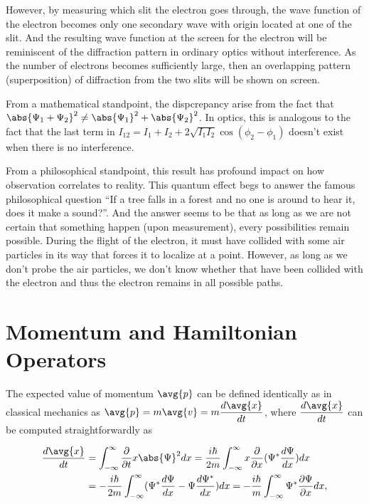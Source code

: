 \documentclass[a4paper,12pt]{report}
\begin{document}
However, by measuring which slit the electron goes through, the wave function of the electron becomes only one secondary wave with origin located at one of the slit. And the resulting wave function at the screen for the electron will be reminiscent of the diffraction pattern in ordinary optics without interference. As the number of electrons becomes sufficiently large, then an overlapping pattern (superposition) of diffraction from the two slits will be shown on screen.

From a mathematical standpoint, the dispcrepancy arise from the fact that \(\abs{\Psi_1 + \Psi_2}^2 \neq \abs{\Psi_1}^2 + \abs{\Psi_2}^2\). In optics, this is analogous to the fact that the last term in \(I_{12} = I_1 + I_2 + 2\sqrt{I_1I_2} \cos(\phi_2 - \phi_1)\) doesn't exist when there is no interference. 

From a philosophical standpoint, this result has profound impact on how observation correlates to reality. This quantum effect begs to answer the famous philosophical question ``If a tree falls in a forest and no one is around to hear it, does it make a sound?''. And the answer seems to be that as long as we are not certain that something happen (upon measurement), every possibilities remain possible. During the flight of the electron, it must have collided with some air particles in its way that forces it to localize at a point. However, as long as we don't probe the air particles, we don't know whether that have been collided with the electron and thus the electron remains in all possible paths.

\section{Momentum and Hamiltonian Operators}
	
The expected value of momentum \(\avg{p} \) can be defined identically as in classical mechanics as \(\displaystyle \avg{p} =m\avg{v} =m\frac{d\avg{x}}{dt}\), where \(\displaystyle \frac{d\avg{x}}{dt}\) can be computed straightforwardly as 
	
\begin{equation}
  \begin{aligned}
    \frac{ d\avg{x} }{ dt} &= \int_{-\infty}^{\infty} \frac{\partial }{\partial t} x \abs{\Psi }^2 dx = \frac{i\hbar }{2m} \int_{-\infty}^{\infty} x \frac{\partial }{\partial x} (\Psi ^* \frac{d\Psi}{dx} )dx \\ &= -\frac{i\hbar }{2m} \int_{-\infty}^{\infty} (\Psi ^* \frac{ d\Psi }{ dx} - \Psi \frac{ d\Psi ^*}{ dx} ) dx = -\frac{i\hbar }{m} \int_{-\infty}^{\infty} \Psi ^* \frac{\partial \Psi }{\partial x} dx,          
  \end{aligned}
\end{equation}
	
\end{document}
